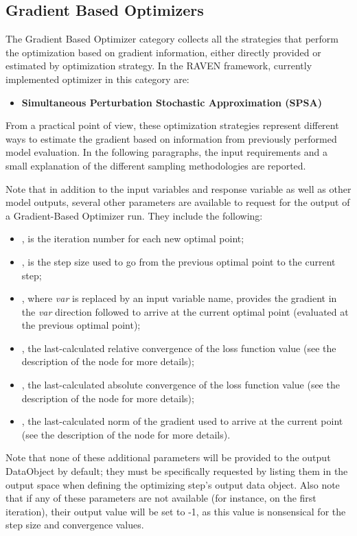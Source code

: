 \subsection{Gradient Based Optimizers}
\label{subsec:gradientBasedOptimizers}
The Gradient Based Optimizer category collects all the strategies that perform the optimization based on gradient information,
 either directly provided or estimated by optimization strategy. In the RAVEN framework, currently implemented optimizer in this
 category are:
\begin{itemize}
\item \textbf{Simultaneous Perturbation Stochastic Approximation (SPSA)}
\end{itemize}

From a practical point of view, these optimization strategies represent different ways to estimate the gradient based on information
from previously performed model evaluation. In the following paragraphs, the input requirements and a small explanation of the
different sampling methodologies are reported.

Note that in addition to the input variables and response variable as well as other model outputs, several
other parameters are available to
request for the output of a Gradient-Based Optimizer run.  They include the following:
\begin{itemize}
  \item {}, is the iteration number for each new optimal point;
  \item {}, is the step size used to go from the previous optimal point to the current step;
  \item {}, where \emph{var} is replaced by an input variable name, provides the
    gradient in the \emph{var} direction followed to arrive at the current optimal point (evaluated at the
    previous optimal point);
  \item {}, the last-calculated relative convergence of the loss function value
    (see the description of the  node for more details);
  \item {}, the last-calculated absolute convergence of the loss function value
    (see the description of the  node for more details);
  \item {}, the last-calculated norm of the gradient used to arrive at the
    current point (see the description of the  node for more details).
\end{itemize}
Note that none of these additional parameters will be provided to the output DataObject by default; they must
be specifically requested by listing them in the output space when defining the optimizing step's output data
object.  Also note that if any of these parameters are not available (for instance, on the first iteration),
their output value will be set to -1, as this value is nonsensical for the step size and convergence values.

